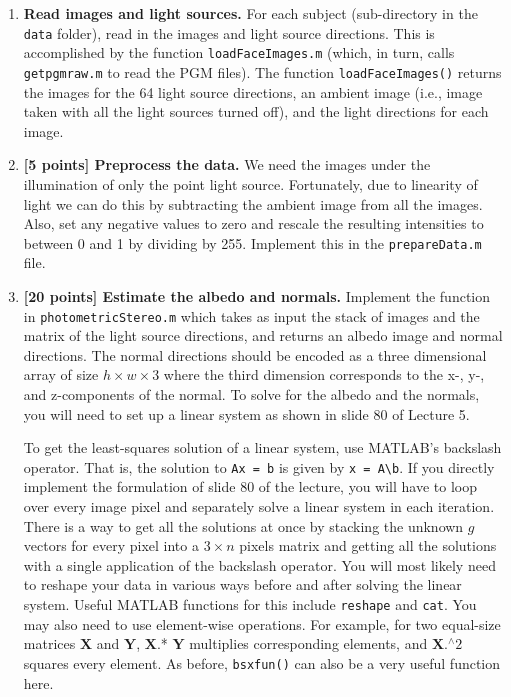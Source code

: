 \documentclass[10pt,letterpaper]{article}
\newcommand{\cmd}[1] {{\color{blue}\texttt{#1}}}
\begin{document}
\begin{enumerate}

\item \textbf{Read images and light sources.} For each subject (sub-directory in the \cmd{data} folder), read in the images and light source directions. This is accomplished by the function \cmd{loadFaceImages.m} (which, in turn, calls \cmd{getpgmraw.m} to read the PGM files). The function \cmd{loadFaceImages()} returns the images for the 64 light source directions, an ambient image (i.e., image taken with all the light sources turned off), and the light directions for each image.

\item \textbf{[5 points] Preprocess the data.} We need the images under the illumination of only the point light source. Fortunately, due to linearity of light we can do this by subtracting the ambient image from all the images. Also, set any negative values to zero and rescale the resulting intensities to between 0 and 1 by dividing by 255. Implement this in the \cmd{prepareData.m} file.


\item \textbf{[20 points] Estimate the albedo and  normals.} Implement the function in  \cmd{photometricStereo.m} which takes as input the stack of images and the matrix of the light source directions, and returns an albedo image and normal directions. The normal directions should be encoded as a three dimensional array of size $h \times w \times 3$ where the third dimension corresponds to the x-, y-, and z-components of the normal. To solve for the albedo and the normals, you will need to set up a linear system as shown in slide 80 of Lecture 5.

To get the least-squares solution of a linear system, use MATLAB's backslash operator. That is, the solution to \cmd{Ax = b} is given by \cmd{x = A\textbackslash b}. If you directly implement the formulation of slide 80 of the lecture, you will have to loop over every image pixel and separately solve a linear system in each iteration. There is a way to get all the solutions at once by stacking the unknown $g$ vectors for every pixel into a $3 \times n$ pixels matrix and getting all the solutions with a single application of the backslash operator.
You will most likely need to reshape your data in various ways before and after solving the linear system. Useful MATLAB functions for this include \cmd{reshape} and \cmd{cat}.
You may also need to use element-wise operations. For example, for two equal-size matrices $\mathbf{X}$ and $\mathbf{Y}$, $\mathbf{X}$.* $\mathbf{Y}$ multiplies corresponding elements, and $\mathbf{X}.^\wedge 2$ squares every element. As before, \cmd{bsxfun()} can also be a very useful function here.


\end{enumerate}
\end{document}

